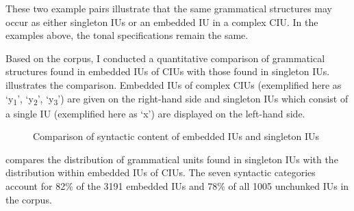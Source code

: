 These two example pairs illustrate that the same grammatical structures may occur as either singleton IUs or an embedded IU in a complex CIU. In the examples above, the tonal specifications remain the same. 

Based on the corpus, I conducted a quantitative comparison of grammatical structures found in embedded IUs of CIUs with those found in singleton IUs.   illustrates the comparison. Embedded IUs of complex CIUs (exemplified here as  `y\textsubscript{1}', `y\textsubscript{2}', `y\textsubscript{3}') are given on the right-hand side and singleton IUs which consist of a single IU (exemplified here as `x') are displayed on the left-hand side.




\begin{figure}
	\caption{Comparison of syntactic content of embedded IUs and singleton IUs}
	
	\label{Comparison of syn}
\end{figure}








  compares the distribution of grammatical units found in singleton IUs with the distribution within embedded IUs of CIUs. The seven syntactic categories account for 82\% of the 3191 embedded IUs and 78\% of all 1005 unchunked IUs in the corpus.

